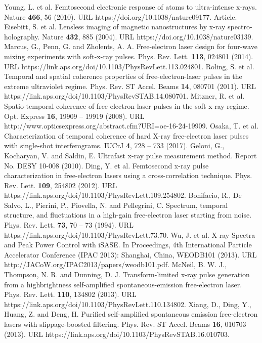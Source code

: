 \documentclass[%
 preprint,
 amsmath,amssymb,
 aps,
 prl,
 superscriptaddress,
 floatfix,
 letter,
]{revtex4-1}
\begin{document}
\begin{thebibliography}{99}
Young, L. et al. Femtosecond electronic response of atoms to ultra-intense x-rays. Nature {\bf 466}, 56 (2010). URL https://doi.org/10.1038/nature09177. Article.
Eisebitt, S. et al. Lensless imaging of magnetic nanostructures by x-ray spectro-holography. Nature {\bf 432}, 885 (2004). URL https://doi.org/10.1038/nature03139.
Marcus, G., Penn, G. and Zholents, A. A. Free-electron laser design for four-wave mixing experiments with soft-x-ray pulses. Phys. Rev. Lett. {\bf 113}, 024801 (2014). URL https://link.aps.org/doi/10.1103/PhysRevLett.113.024801.
Roling, S. et al. Temporal and spatial coherence properties of free-electron-laser pulses in the extreme ultraviolet regime. Phys. Rev. ST Accel. Beams {\bf 14}, 080701 (2011). URL https://link.aps.org/doi/10.1103/PhysRevSTAB.14.080701.
Mitzner, R. et al. Spatio-temporal coherence of free electron laser pulses in the soft x-ray regime. Opt. Express {\bf 16}, 19909 -- 19919 (2008). URL http://www.opticsexpress.org/abstract.cfm?URI=oe-16-24-19909.
Osaka, T. et al. Characterization of temporal coherence of hard X-ray free-electron laser pulses with single-shot interferograms. IUCrJ {\bf 4}, 728 -- 733 (2017).
Geloni, G., Kocharyan, V. and Saldin, E. Ultrafast x-ray pulse measurement method. Report No. DESY 10-008 (2010).
Ding, Y. et al. Femtosecond x-ray pulse characterization in free-electron lasers using a cross-correlation technique. Phys. Rev. Lett. {\bf 109}, 254802 (2012). URL https://link.aps.org/doi/10.1103/PhysRevLett.109.254802.
Bonifacio, R., De Salvo, L., Pierini, P., Piovella, N. and Pellegrini, C. Spectrum, temporal structure, and fluctuations in a high-gain free-electron laser starting from noise. Phys. Rev. Lett. {\bf 73}, 70 -- 73 (1994). URL https://link.aps.org/doi/10.1103/PhysRevLett.73.70.
Wu, J. et al. X-ray Spectra and Peak Power Control with iSASE. In Proceedings, 4th International Particle Accelerator Conference (IPAC 2013): Shanghai, China, WEODB101 (2013). URL http://JACoW.org/IPAC2013/papers/weodb101.pdf.
McNeil, B. W. J., Thompson, N. R. and Dunning, D. J. Transform-limited x-ray pulse generation from a highbrightness self-amplified spontaneous-emission free-electron laser. Phys. Rev. Lett. {\bf 110}, 134802 (2013). URL https://link.aps.org/doi/10.1103/PhysRevLett.110.134802.
Xiang, D., Ding, Y., Huang, Z. and Deng, H. Purified self-amplified spontaneous emission free-electron lasers with slippage-boosted filtering. Phys. Rev. ST Accel. Beams {\bf 16}, 010703 (2013). URL https://link.aps.org/doi/10.1103/PhysRevSTAB.16.010703.

\end{thebibliography}
\end{document}
